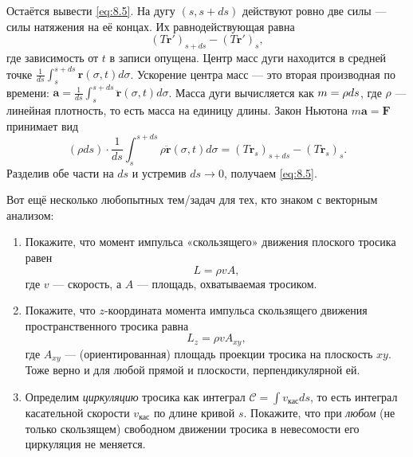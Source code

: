 Остаётся вывести \eqref{eq:8.5}.
На дугу $(s, s+ds)$ действуют ровно две силы --- силы натяжения на её концах.
Их равнодействующая равна
\[
(T \mathbf{r}')_{s+ds} - (T \mathbf{r}')_s ,
\]
где зависимость от $t$ в записи опущена.
Центр масс дуги находится в средней точке $
\tfrac{1}{ds} \int_s^{s+ds} \mathbf{r}(\sigma, t) d\sigma$.
Ускорение центра масс --- это вторая производная по времени:
$\mathbf{a} = \tfrac{1}{ds} \int_s^{s+ds} \ddot{\mathbf{r}}(\sigma, t) d\sigma$.
Масса дуги вычисляется как $m \z= \rho ds$, где $\rho$ --- линейная плотность, то есть масса на единицу длины.
Закон Ньютона $m\mathbf{a} = \mathbf{F}$ принимает вид
\begin{equation}
(\rho ds)
\cdot
\frac{1}{ds}
\int_s^{s+ds}
\rho\ddot{\mathbf{r}}(\sigma, t) d\sigma
= (T \mathbf{r}_s)_{s+ds} - (T \mathbf{r}_s)_s .
\end{equation}
Разделив обе части на $ds$ и устремив $ds \to 0$, получаем \eqref{eq:8.5}.

\medskip

Вот ещё несколько любопытных тем/задач для тех, кто знаком с векторным анализом:

\begin{enumerate}
\item Покажите, что момент импульса «скользящего» движения плоского тросика равен
\begin{equation}
L = \rho v A ,
\end{equation}
где $v$ --- скорость, а $A$ --- площадь, охватываемая тросиком.
\item Покажите, что $z$-координата момента импульса скользящего движения пространственного тросика равна
\begin{equation}
L_z = \rho v A_{xy},
\end{equation}
где $A_{xy}$ --- (ориентированная) площадь проекции тросика на плоскость $xy$.
Тоже верно и для любой прямой и плоскости, перпендикулярной ей.
\item Определим \emph{циркуляцию} тросика как интеграл
$\mathcal{C} = \int v_{\text{кас}} ds$,
то есть интеграл касательной скорости $v_{\text{кас}}$ по длине кривой $s$.
Покажите, что при \emph{любом} (не только скользящем) свободном движении тросика в невесомости
его циркуляция не меняется.
\end{enumerate}


